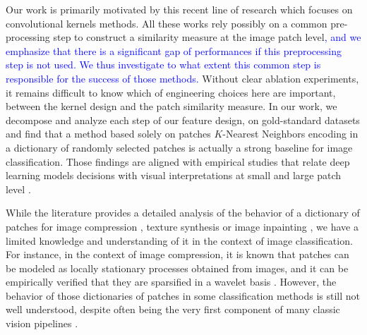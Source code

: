 \documentclass{article} %
\newcommand{\Edouard}[1]{\textcolor{blue}{#1}}
\begin{document}
Our work is primarily motivated by this recent line of research which focuses on convolutional kernels methods.
All these works rely possibly on a common pre-processing step to construct a similarity measure at the image patch level\Edouard{, and we emphasize that there is a significant gap of performances if this preprocessing step is not used. We thus investigate to what extent this common step is responsible for the success of those methods.} 
Without clear ablation experiments, it remains difficult to know which of engineering choices here are important, between the kernel design and the patch similarity measure. In our work, we decompose and analyze each step of our feature design, on gold-standard datasets and find that a method based solely on patches $K$-Nearest Neighbors encoding in a dictionary of randomly selected patches is actually a strong baseline for image classification. 
Those findings are aligned with empirical studies that relate deep learning models decisions with visual interpretations at small and large patch level
\citep{zeiler2014visualizing,brendel2019approximating}.


 While the literature provides a detailed analysis of the behavior of a dictionary of patches for image compression
\citep{wallace1992jpeg}, texture synthesis \citep{efros1999texture} or image inpainting \citep{criminisi2004region}, we have a limited knowledge and understanding of it in the context of image classification. For instance, in the context of image compression, it is known that patches can be modeled as locally stationary processes obtained from images, and it can be empirically verified that they are sparsified in a wavelet basis \citep{mallat1999wavelet}. However, the behavior of those dictionaries of patches in some classification methods is still not well understood, despite often being the very first component of many classic vision pipelines \citep{perronnin2010improving,lowe2004distinctive,brendel2019approximating,oyallon2018scattering}.
\end{document}
